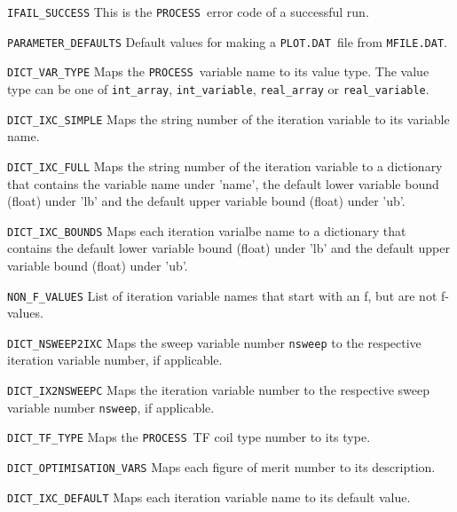 \documentclass[11pt,a4paper]{report}
\newcommand{\mfile}{\mbox{\texttt{MFILE.DAT}}}
\newcommand{\plotdat}{\mbox{\texttt{PLOT.DAT}}}
\newcommand{\process}{\mbox{\texttt{PROCESS}}}
\begin{document}
\begin{description}

\item{\verb|IFAIL_SUCCESS|} This is the \process\ error code of a successful
  run.

\item{\verb|PARAMETER_DEFAULTS|} Default values for making a \plotdat\ file
  from \mfile.

\item{\verb|DICT_VAR_TYPE|} Maps the \process\ variable name to its value
  type. The value type can be one of \verb|int_array|, \verb|int_variable|,
  \verb|real_array| or \verb|real_variable|.

\item{\verb|DICT_IXC_SIMPLE|} Maps the string number of the iteration variable
  to its variable name.

\item{\verb|DICT_IXC_FULL|} Maps the string number of the iteration variable
  to a dictionary that contains the variable name under 'name', the default
  lower variable bound (float) under 'lb' and the default upper variable bound
  (float) under 'ub'.

\item{\verb|DICT_IXC_BOUNDS|} Maps each iteration varialbe name to a
  dictionary that contains the default lower variable bound (float) under 'lb'
  and the default upper variable bound (float) under 'ub'.

\item{\verb|NON_F_VALUES|} List of iteration variable names that start with an
  f, but are not f-values.

\item{\verb|DICT_NSWEEP2IXC|} Maps the sweep variable number \texttt{nsweep}
  to the respective iteration variable number, if applicable.

\item{\verb|DICT_IX2NSWEEPC|} Maps the iteration variable number to the
  respective sweep variable number \texttt{nsweep}, if applicable.

\item{\verb|DICT_TF_TYPE|} Maps the \process\ TF coil type number to its type.

\item{\verb|DICT_OPTIMISATION_VARS|} Maps each figure of merit number to its
  description.

\item{\verb|DICT_IXC_DEFAULT|} Maps each iteration variable name to its
  default value.

\end{description}
\end{document}
